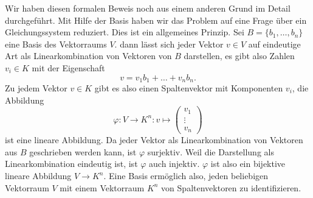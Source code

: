 Wir haben diesen formalen Beweis noch aus einem anderen Grund im
Detail durchgeführt.
Mit Hilfe der Basis haben wir das Problem auf eine Frage über ein
Gleichungssystem reduziert.
Dies ist ein allgemeines Prinzip.
Sei $B=\{b_1,\dots,b_n\}$ eine Basis des Vektorraums $V$.
dann lässt sich jeder Vektor $v\in V$  auf eindeutige Art als
Linearkombination von Vektoren von $B$ darstellen, es gibt
also Zahlen $v_i\in K$ mit der Eigenschaft
\[
v=v_1b_1+\dots+v_nb_n.
\]
Zu jedem Vektor $v\in K$ gibt es also einen Spaltenvektor mit Komponenten
$v_i$, die Abbildung
\[
\varphi\colon
V\to K^n
:
v\mapsto \begin{pmatrix}v_1\\\vdots\\v_n\end{pmatrix}
\]
ist eine lineare Abbildung.
Da jeder Vektor als Linearkombination von Vektoren aus $B$ geschrieben
werden kann, ist $\varphi$ surjektiv.
Weil die Darstellung als Linearkombination eindeutig ist, ist $\varphi$
auch injektiv.
$\varphi$ ist also ein bijektive lineare Abbildung $V\to K^n$.
Eine Basis ermöglich also, jeden beliebigen Vektorraum $V$ mit einem
Vektorraum $K^n$ von Spaltenvektoren zu identifizieren.




